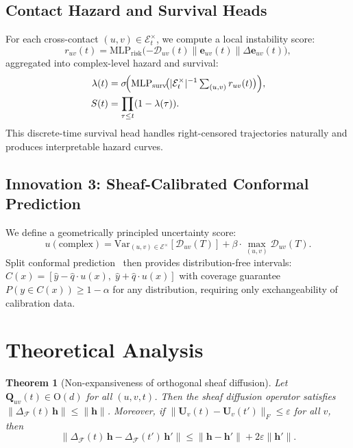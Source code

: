 \documentclass{article}
\newtheorem{theorem}{Theorem}
\begin{document}
\subsection{Contact Hazard and Survival Heads}
\label{sec:heads}

For each cross-contact $(u,v) \in \mathcal{E}^\times_t$, we compute
a local instability score:
\begin{equation}
  r_{uv}(t)
  = \text{MLP}_\text{risk}\!\bigl(
    {-\mathcal{D}_{uv}(t)} \|
    \mathbf{e}_{uv}(t) \|
    \Delta\mathbf{e}_{uv}(t)
  \bigr),
  \label{eq:risk}
\end{equation}
aggregated into complex-level hazard and survival:
\begin{align}
  \lambda(t)
  &= \sigma\!\Bigl(
    \text{MLP}_\text{surv}\!\bigl(
      |\mathcal{E}^\times_t|^{-1}
      \textstyle\sum_{(u,v)} r_{uv}(t)
    \bigr)
  \Bigr),
  \label{eq:hazard} \\
  S(t)
  &= \prod_{\tau \le t} (1 - \lambda(\tau)).
  \label{eq:survival}
\end{align}
This discrete-time survival head handles right-censored trajectories
naturally and produces interpretable hazard curves.

\subsection{Innovation 3: Sheaf-Calibrated Conformal Prediction}
\label{sec:conformal}

We define a geometrically principled uncertainty score:
\begin{equation}
  u(\text{complex})
  = \text{Var}_{(u,v) \in \mathcal{E}^\times}
    [\mathcal{D}_{uv}(T)]
  + \beta \cdot \max_{(u,v)} \mathcal{D}_{uv}(T).
  \label{eq:uncertainty}
\end{equation}
Split conformal prediction~\citep{vovk2005algorithmic} then provides
distribution-free intervals:
$C(x) = [\hat{y} - \hat{q} \cdot u(x),\;
\hat{y} + \hat{q} \cdot u(x)]$
with coverage guarantee
$P(y \in C(x)) \ge 1 - \alpha$ for any distribution, requiring
only exchangeability of calibration data.

\section{Theoretical Analysis}
\label{sec:theory}

\begin{theorem}[Non-expansiveness of orthogonal sheaf diffusion]
\label{thm:nonexp}
Let $\mathbf{Q}_{uv}(t) \in \mathrm{O}(d)$ for all $(u,v,t)$.
Then the sheaf diffusion operator satisfies
$\|\Delta_\mathcal{F}(t)\,\mathbf{h}\| \le \|\mathbf{h}\|$.
Moreover, if $\|\mathbf{U}_v(t) - \mathbf{U}_v(t')\|_F \le \varepsilon$
for all $v$, then
\begin{equation}
  \|\Delta_\mathcal{F}(t)\,\mathbf{h}
  - \Delta_\mathcal{F}(t')\,\mathbf{h}'\|
  \le \|\mathbf{h} - \mathbf{h}'\| + 2\varepsilon\|\mathbf{h}'\|.
  \label{eq:stability}
\end{equation}
\end{theorem}
\end{document}
